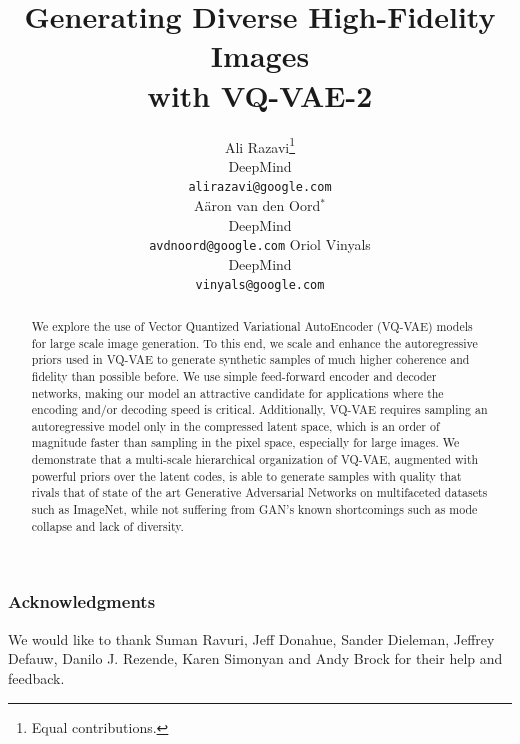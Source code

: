 \documentclass{article}
\title{Generating Diverse High-Fidelity Images\\ with VQ-VAE-2}
\author{
  Ali Razavi\thanks{Equal contributions.} \\
  DeepMind\\
  \texttt{alirazavi@google.com}\\
  \And
  A\"aron van den Oord$^{\ast}$ \\
  DeepMind \\
  \texttt{avdnoord@google.com}
  \And
  Oriol Vinyals \\
  DeepMind \\
  \texttt{vinyals@google.com}
}
\begin{document}
\maketitle
\begin{abstract}
We explore the use of Vector Quantized Variational AutoEncoder (VQ-VAE) models for large scale image generation.
To this end, we scale and enhance the autoregressive priors used in VQ-VAE to generate synthetic samples of much higher coherence and fidelity than possible before. 
We use simple feed-forward encoder and decoder networks, making our model an attractive candidate for applications where the encoding and/or decoding speed is critical. Additionally, VQ-VAE  requires sampling an autoregressive model only in the compressed latent space, which is an order of magnitude faster than sampling in the pixel space, especially for large images.
We demonstrate that a multi-scale hierarchical organization of  VQ-VAE, augmented with powerful priors over the latent codes, is able to generate samples with quality that rivals that of state of the art Generative Adversarial Networks on multifaceted datasets such as ImageNet, while not suffering from GAN's known shortcomings such as mode collapse and lack of diversity. 
\end{abstract}








\subsubsection*{Acknowledgments}
We would like to thank Suman Ravuri, Jeff Donahue, Sander Dieleman, Jeffrey Defauw, Danilo J. Rezende, Karen Simonyan and Andy Brock for their help and feedback.

\pagebreak
\medskip
{\small


}

\newpage

\end{document}
